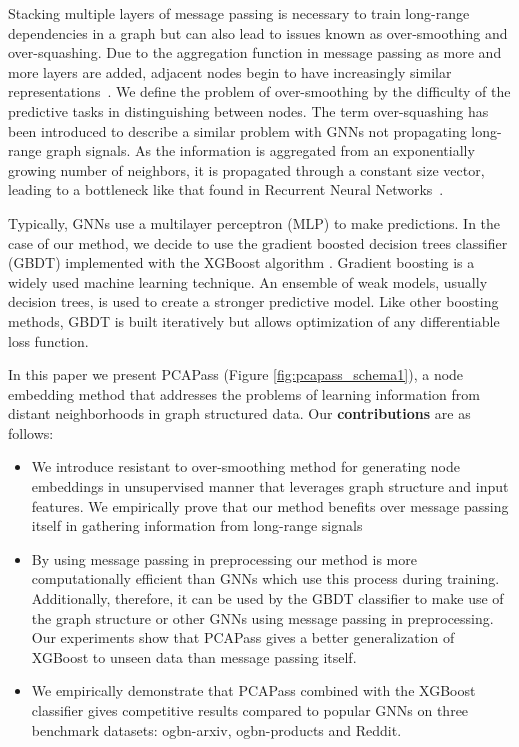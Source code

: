 \documentclass[nohyperref]{article}
\theoremstyle{plain}
\theoremstyle{definition}
\theoremstyle{remark}
\begin{document}
Stacking multiple layers of message passing is necessary to train long-range dependencies in a graph but can also lead to issues known as over-smoothing and over-squashing. 
Due to the aggregation function in message passing as more and more layers are added, adjacent nodes begin to have increasingly similar representations~\cite{li2018deeper}.
We define the problem of over-smoothing by the difficulty of the predictive tasks in distinguishing between nodes. The term over-squashing has been introduced to describe a similar problem with GNNs not propagating long-range graph signals. As the information is aggregated from an exponentially growing number of neighbors, it is propagated through a constant size vector, leading to a bottleneck like that found in Recurrent Neural Networks~\cite{alon2021bottleneck}.

Typically, GNNs use a multilayer perceptron (MLP) to make predictions.
In the case of our method, we decide to use the gradient boosted decision trees classifier (GBDT) implemented with the XGBoost algorithm \cite{xgboost2016}.
Gradient boosting is a widely used machine learning technique.
An ensemble of weak models, usually decision trees, is used to create a stronger predictive model.
Like other boosting methods, GBDT is built iteratively but allows optimization of any differentiable loss function.

In this paper we present PCAPass (Figure \ref{fig:pcapass_schema1}), a node embedding method that addresses the problems of learning information from distant neighborhoods in graph structured data. 
Our \textbf{contributions} are as follows:


\begin{itemize}
\item We introduce resistant to over-smoothing method for generating node embeddings in unsupervised manner that leverages graph structure and input features. We empirically prove that our method benefits over message passing itself in gathering information from long-range signals
\item By using message passing in preprocessing our method is more computationally efficient than GNNs which use this process during training. Additionally, therefore, it can be used by the GBDT classifier to make use of the graph structure or other GNNs using message passing in preprocessing.
Our experiments show that PCAPass gives a better generalization of XGBoost to unseen data than message passing itself.
\item We empirically demonstrate that PCAPass combined with the XGBoost classifier gives competitive results compared to popular GNNs on three benchmark datasets: ogbn-arxiv, ogbn-products and Reddit.
\end{itemize}
\end{document}
